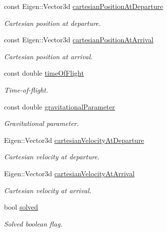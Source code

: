 \begin{DoxyCompactItemize}
\item 
const Eigen\+::\+Vector3d \hyperlink{classtudat_1_1mission__segments_1_1LambertTargeter_a67d3a9e1b514c0ca2dad3f235c46941b}{cartesian\+Position\+At\+Departure}
\begin{DoxyCompactList}\small\item\em Cartesian position at departure. \end{DoxyCompactList}\item 
const Eigen\+::\+Vector3d \hyperlink{classtudat_1_1mission__segments_1_1LambertTargeter_ab710c1fabfd56361c457449c99efd5fa}{cartesian\+Position\+At\+Arrival}
\begin{DoxyCompactList}\small\item\em Cartesian position at arrival. \end{DoxyCompactList}\item 
const double \hyperlink{classtudat_1_1mission__segments_1_1LambertTargeter_a74f0ac221b22693ba7fe0b7398007e9b}{time\+Of\+Flight}
\begin{DoxyCompactList}\small\item\em Time-\/of-\/flight. \end{DoxyCompactList}\item 
const double \hyperlink{classtudat_1_1mission__segments_1_1LambertTargeter_ab22c920bfc0f13cdfee122fa2bb93ea2}{gravitational\+Parameter}
\begin{DoxyCompactList}\small\item\em Gravitational parameter. \end{DoxyCompactList}\item 
Eigen\+::\+Vector3d \hyperlink{classtudat_1_1mission__segments_1_1LambertTargeter_a461475bd753a2ba590f1a403a8695794}{cartesian\+Velocity\+At\+Departure}
\begin{DoxyCompactList}\small\item\em Cartesian velocity at departure. \end{DoxyCompactList}\item 
Eigen\+::\+Vector3d \hyperlink{classtudat_1_1mission__segments_1_1LambertTargeter_a7260e16ff3a70f4971945d66ef08e682}{cartesian\+Velocity\+At\+Arrival}
\begin{DoxyCompactList}\small\item\em Cartesian velocity at arrival. \end{DoxyCompactList}\item 
bool \hyperlink{classtudat_1_1mission__segments_1_1LambertTargeter_aa9dd030ab3e408d72f44c4f9ea2fe03a}{solved}
\begin{DoxyCompactList}\small\item\em Solved boolean flag. \end{DoxyCompactList}\end{DoxyCompactItemize}



